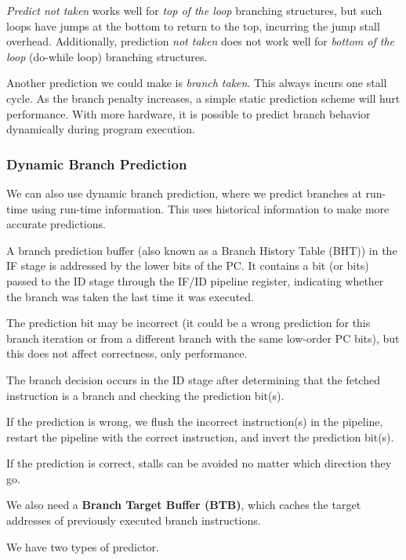 \textit{Predict not taken} works well for \textit{top of the loop} branching structures, but such loops have jumps at the bottom to return to the top, incurring the jump stall overhead. Additionally, prediction \textit{not taken} does not work well for \textit{bottom of the loop} (do-while loop) branching structures.

Another prediction we could make is \textit{branch taken}. This always incurs one stall cycle. As the branch penalty increases, a simple static prediction scheme will hurt performance. With more hardware, it is possible to predict branch behavior dynamically during program execution.

\subsubsection*{Dynamic Branch Prediction}
We can also use dynamic branch prediction, where we predict branches at run-time using run-time information. This uses historical information to make more accurate predictions.

A branch prediction buffer (also known as a Branch History Table (BHT)) in the IF stage is addressed by the lower bits of the PC. It contains a bit (or bits) passed to the ID stage through the IF/ID pipeline register, indicating whether the branch was taken the last time it was executed.

The prediction bit may be incorrect (it could be a wrong prediction for this branch iteration or from a different branch with the same low-order PC bits), but this does not affect correctness, only performance.

The branch decision occurs in the ID stage after determining that the fetched instruction is a branch and checking the prediction bit(s).

If the prediction is wrong, we flush the incorrect instruction(s) in the pipeline, restart the pipeline with the correct instruction, and invert the prediction bit(s).

If the prediction is correct, stalls can be avoided no matter which direction they go.

We also need a \textbf{Branch Target Buffer (BTB)}, which caches the target addresses of previously executed branch instructions.

We have two types of predictor. 


